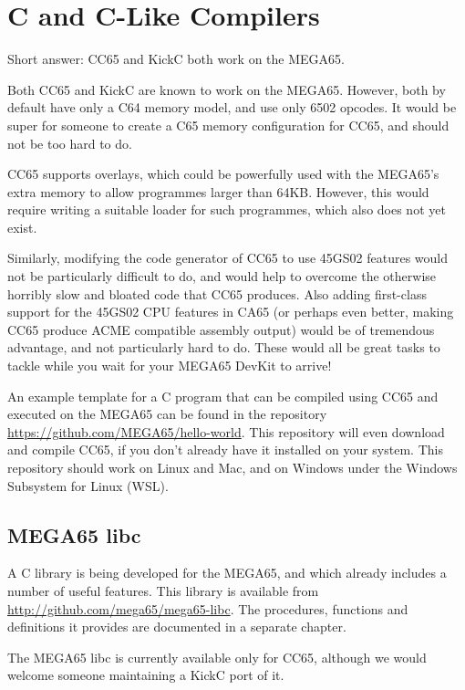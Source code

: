 \chapter{C and C-Like Compilers}

Short answer: CC65 and KickC both work on the MEGA65.

Both CC65 and KickC are known to work on the MEGA65.  However, both by
default have only a C64 memory model, and use only 6502 opcodes.
It would be super for someone to create a C65 memory configuration for
CC65, and should not be too hard to do.

CC65 supports overlays, which
could be powerfully used with the MEGA65's extra memory to allow
programmes larger than 64KB.  However, this would require writing a
suitable loader for such programmes, which also does not yet exist.

Similarly, modifying the code
generator of CC65 to use 45GS02 features would not be particularly
difficult to do, and would help to overcome the otherwise horribly
slow and bloated code that CC65 produces.  Also adding first-class
support for the 45GS02 CPU features in CA65 (or perhaps even better,
making CC65 produce ACME compatible assembly output) would be of
tremendous advantage, and not particularly hard to do.  These would
all be great tasks to tackle while you wait for your MEGA65 DevKit to
arrive!

An example template for a C program that can be compiled using CC65
and executed on the MEGA65 can be found in the repository
\url{https://github.com/MEGA65/hello-world}.  This repository will
even download and compile CC65, if you don't already have it installed
on your system.  This repository should work on Linux and Mac, and
on Windows under the Windows Subsystem for Linux (WSL).

\section{MEGA65 libc}

A C library is being developed for the MEGA65, and which already
includes a number of useful features. This library is available from
\url{http://github.com/mega65/mega65-libc}. The procedures,
functions and definitions it provides are documented in a separate
chapter.

The MEGA65 libc is currently available only for CC65, although we would
welcome someone maintaining a KickC port of it.
